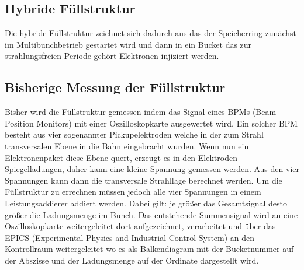 \subsection{Hybride Füllstruktur}
\label{sec:HybrideFuellstruktur}
Die hybride Füllstruktur zeichnet sich dadurch aus das der Speicherring zunächst im Multibunchbetrieb
gestartet wird und dann in ein Bucket das zur strahlungsfreien Periode gehört Elektronen injiziert werden.

\subsection{Bisherige Messung der Füllstruktur}
\label{sec:WasBisherGeschah}
Bisher wird die Füllstruktur gemessen indem das Signal eines BPMs (Beam Position Monitors) mit einer
Oszilloskopkarte ausgewertet wird. Ein solcher BPM besteht aus vier sogenannter Pickupelektroden
welche in der zum Strahl transversalen Ebene in die Bahn eingebracht wurden. Wenn nun ein Elektronenpaket
diese Ebene quert, erzeugt es in den Elektroden Spiegelladungen, daher kann eine kleine Spannung gemessen 
werden. Aus den vier Spannungen kann dann die transversale Strahllage berechnet werden. Um die Füllstruktur
zu errechnen müssen jedoch alle vier Spannungen in einem Leistungsaddierer addiert werden. Dabei gilt:
je größer das Gesamtsignal desto größer die Ladungsmenge im Bunch. Das entstehende 
Summensignal wird an eine Oszilloskopkarte weitergeleitet dort aufgezeichnet, verarbeitet und über das 
EPICS (Experimental Physics and Industrial Control System) an den Kontrollraum weitergeleitet wo es
als Balkendiagram mit der Bucketnummer auf der Abszisse und der Ladungsmenge auf der Ordinate dargestellt 
wird.



